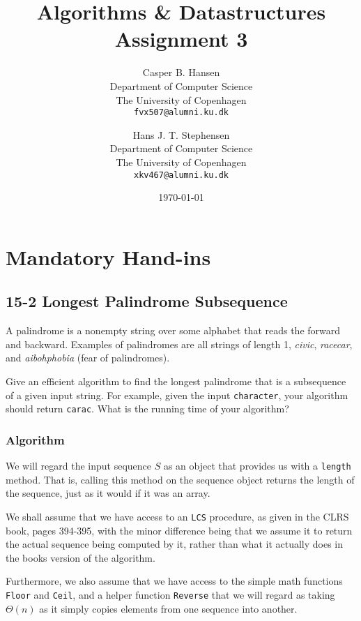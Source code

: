 \documentclass[11pt,english]{article}
\title
{
	\vspace{1in}
	Algorithms \& Datastructures\\
	\huge Assignment 3
}
\author
{
	Casper B. Hansen\\
	\small Department of Computer Science\\
	\small The University of Copenhagen\\
	\texttt{fvx507@alumni.ku.dk}
	\and
	Hans J. T. Stephensen\\
	\small Department of Computer Science\\
	\small The University of Copenhagen\\
	\texttt{xkv467@alumni.ku.dk}
}
\date{\today}
\begin{document}
\clearpage
\maketitle
\thispagestyle{empty}


\newpage
\pagestyle{fancy}

\section*{Mandatory Hand-ins}

\subsection*{15-2 Longest Palindrome Subsequence}
\large{A palindrome is a nonempty string over some alphabet that reads the
forward and backward. Examples of palindromes are all strings of length 1,
\textit{civic}, \textit{racecar}, and \textit{aibohphobia} (fear of
palindromes).

Give an efficient algorithm to find the longest palindrome that is a
subsequence of a given input string. For example, given the input
\texttt{character}, your algorithm should return \texttt{carac}. What is the
running time of your algorithm?}

\subsubsection*{Algorithm}
We will regard the input sequence $S$ as an object that provides us with a
\texttt{length} method. That is, calling this method on the sequence object
returns the length of the sequence, just as it would if it was an array.

We shall assume that we have access to an \texttt{LCS} procedure, as given in
the CLRS book, pages 394-395, with the minor difference being that we assume
it to return the actual sequence being computed by it, rather than what it
actually does in the books version of the algorithm.

Furthermore, we also assume that we have access to the simple math functions
\texttt{Floor} and \texttt{Ceil}, and a helper function \texttt{Reverse} that
we will regard as taking $\Theta(n)$ as it simply copies elements from one
sequence into another.
\end{document}
